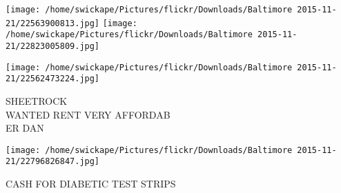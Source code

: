 \documentclass[10pt,letterpaper]{article}
\begin{document}
\texttt{[image: /home/swickape/Pictures/flickr/Downloads/Baltimore 2015-11-21/22563900813.jpg]}
\texttt{[image: /home/swickape/Pictures/flickr/Downloads/Baltimore 2015-11-21/22823005809.jpg]}

\texttt{[image: /home/swickape/Pictures/flickr/Downloads/Baltimore 2015-11-21/22562473224.jpg]}

SHEETROCK\\
WANTED RENT VERY AFFORDAB\\
ER DAN\\
\pagebreak

\texttt{[image: /home/swickape/Pictures/flickr/Downloads/Baltimore 2015-11-21/22796826847.jpg]}

CASH FOR DIABETIC TEST STRIPS\\
\pagebreak
\end{document}
